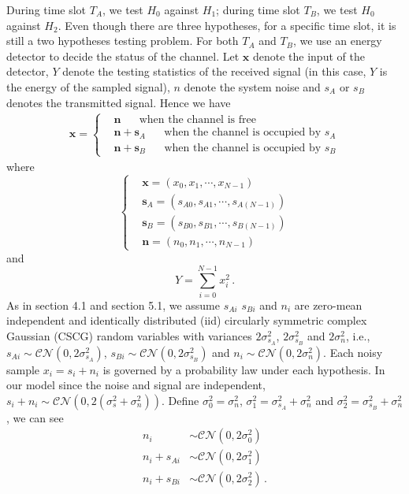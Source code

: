 During time slot $T_A$, we  test $H_0$ against $H_1$; during time slot $T_B$, we test $H_0$ against $H_2$. 
Even though there are three hypotheses, for a specific time slot, it is still a two hypotheses testing problem.  
For both $T_A$ and $T_B$, we use an energy detector to decide the status of the channel. Let $\mathbf{x}$ denote the input of the detector, $Y$ denote the testing statistics of the received signal (in this case, $Y$ is the energy of the sampled signal), $n$  denote the system noise and $s_A$ or $s_B$ denotes the transmitted signal. Hence we have
\begin{eqnarray}
  \mathbf{x} = \begin{cases}
    &\mathbf{n}\;\;\;\;\;\;\text{when the channel is free}\\
    &\mathbf{n} + \mathbf{s}_A \;\;\;\;\;\;\text{when the channel is occupied by $s_A$}\\
    &\mathbf{n} + \mathbf{s}_B \;\;\;\;\;\;\text{when the channel is occupied by $s_B$}
  \end{cases}
  \label{20150627a0}
\end{eqnarray}
where
\begin{equation}
  \begin{cases}
  &\mathbf{x} = (x_0, x_1, \cdots, x_{N-1})\\
  &\mathbf{s}_A = (s_{A0}, s_{A1}, \cdots, s_{A(N-1)})\\
  &\mathbf{s}_B = (s_{B0}, s_{B1}, \cdots, s_{B(N-1)})\\
  &\mathbf{n} = (n_{0}, n_{1}, \cdots, n_{N-1})
  \end{cases}
  \label{20150627a1}
\end{equation}
and
\begin{equation}
Y = \sum_{i=0}^{N-1} x_i^2\,.
\end{equation}
As in section 4.1 and section 5.1, we assume  $s_{Ai}$ $s_{Bi}$ and $n_i$ are zero-mean independent and identically distributed (iid) circularly symmetric complex Gaussian (CSCG) random variables with variances $2\sigma_{s_A}^2$, $2\sigma_{s_B}^2$ and $2\sigma_{n}^2$, i.e., $s_{Ai} \sim \mathcal{CN}(0, 2\sigma_{s_A}^2)$, $s_{Bi} \sim \mathcal{CN}(0, 2\sigma_{s_B}^2)$ and $n_i \sim \mathcal{CN}(0, 2\sigma_{n}^2)$.
Each noisy sample $x_i = s_i + n_i$ is governed by a probability law under each hypothesis. In our model
since the noise and signal are independent, $s_i+ n_i \sim \mathcal{CN}(0, 2(\sigma_{s}^2 + \sigma_n^2))$.  Define $\sigma_0^2 = \sigma_n^2$, $\sigma_1^2 = \sigma_{s_A}^2 + \sigma_n^2$ and $\sigma_2^2 = \sigma_{s_B}^2 + \sigma_n^2$, we can see
\begin{equation}
  \label{20150627a2}
  \begin{split}
  n_i &\sim \mathcal{CN}(0, 2\sigma_0^2)\\
  n_i + s_{Ai} &\sim \mathcal{CN}(0, 2\sigma_1^2)\\
   n_i + s_{Bi}&\sim \mathcal{CN}(0, 2\sigma_2^2) \,.
  \end{split}
\end{equation}

